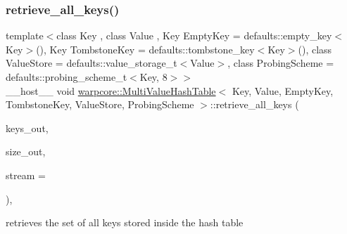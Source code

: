 \subsubsection{\texorpdfstring{retrieve\+\_\+all\+\_\+keys()}{retrieve\_all\_keys()}}
{\footnotesize\ttfamily template$<$class Key , class Value , Key Empty\+Key = defaults\+::empty\+\_\+key$<$\+Key$>$(), Key Tombstone\+Key = defaults\+::tombstone\+\_\+key$<$\+Key$>$(), class Value\+Store  = defaults\+::value\+\_\+storage\+\_\+t$<$\+Value$>$, class Probing\+Scheme  = defaults\+::probing\+\_\+scheme\+\_\+t$<$\+Key, 8$>$$>$ \\
\+\_\+\+\_\+host\+\_\+\+\_\+ void \hyperlink{classwarpcore_1_1MultiValueHashTable}{warpcore\+::\+Multi\+Value\+Hash\+Table}$<$ Key, Value, Empty\+Key, Tombstone\+Key, Value\+Store, Probing\+Scheme $>$\+::retrieve\+\_\+all\+\_\+keys (\begin{DoxyParamCaption}\item[{key\+\_\+type $\ast$}]{keys\+\_\+out,  }\item[{index\+\_\+type \&}]{size\+\_\+out,  }\item[{cuda\+Stream\+\_\+t}]{stream = {} }\end{DoxyParamCaption})\hspace{0.3cm}{\ttfamily [inline]}, {\ttfamily [noexcept]}}



retrieves the set of all keys stored inside the hash table 


